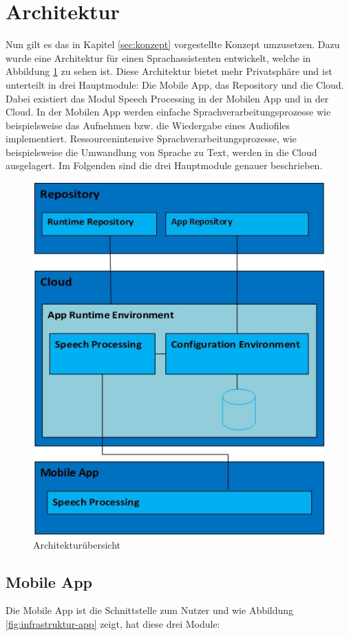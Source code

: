 \section{Architektur}\label{sec:architecure}
Nun gilt es das in Kapitel \ref{sec:konzept} vorgestellte Konzept umzusetzen. Dazu wurde eine Architektur für einen Sprachassistenten entwickelt, welche in Abbildung \ref{fig:infrastruktur-overview} zu sehen ist. Diese Architektur bietet mehr Privatsphäre und ist unterteilt in drei Hauptmodule: Die Mobile App, das Repository und die Cloud. Dabei existiert das Modul \glqq Speech Processing\grqq{} in der Mobilen App und in der Cloud. In der Mobilen App werden einfache Sprachverarbeitungsprozesse wie beispielsweise das Aufnehmen bzw. die Wiedergabe eines Audiofiles implementiert. Ressourcenintensive Sprachverarbeitungsprozesse, wie beispielsweise die Umwandlung von Sprache zu Text, werden in die Cloud ausgelagert. Im Folgenden sind die drei Hauptmodule genauer beschrieben.
\begin{figure}[h!]
	\centering
	\includegraphics[width=0.8\linewidth]{Picture/Infrastruktur-Overview.jpg}
	\caption[Architekturübersicht]{Architekturübersicht}
	\label{fig:infrastruktur-overview}
\end{figure}

\subsection{Mobile App}
Die Mobile App ist die Schnittstelle zum Nutzer und wie Abbildung \ref{fig:infrastruktur-app} zeigt, hat diese drei Module:


